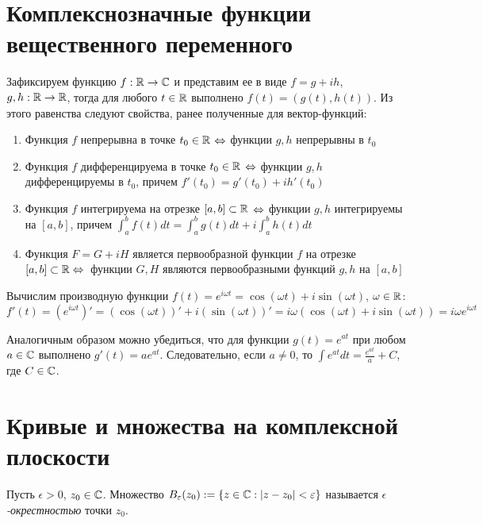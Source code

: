 \section{Комплекснозначные функции вещественного переменного}

\begin{note}
	Зафиксируем функцию $f : \mathbb{R} \to \mathbb{C}$ и представим ее в виде $f = g + ih$, $g, h : \mathbb{R} \to \mathbb{R}$, тогда для любого $t \in \mathbb{R}$ выполнено $f(t) = (g(t), h(t))$. Из этого равенства следуют свойства, ранее полученные для вектор-функций:
	\begin{enumerate}
		\item Функция $f$ непрерывна в точке $t_0 \in \mathbb{R}$ $\Leftrightarrow$ функции $g, h$ непрерывны в $t_0$
		\item Функция $f$ дифференцируема в точке $t_0 \in \mathbb{R}$ $\Leftrightarrow$ функции $g, h$ дифференцируемы в $t_0$, причем $f'(t_0) = g'(t_0) + ih'(t_0)$
		\item Функция $f$ интегрируема на отрезке $[a, b] \subset \mathbb{R}$ $\Leftrightarrow$ функции $g, h$ интегрируемы на $[a, b]$, причем $\int_a^bf(t)dt = \int_a^bg(t)dt + i\int_a^bh(t)dt$
		\item Функция $F = G + iH$ является первообразной функции $f$ на отрезке $[a, b] \subset \R \hm\lra$~функции $G, H$ являются первообразными функций $g, h$ на $[a, b]$
	\end{enumerate}
\end{note}

\begin{example}
	Вычислим производную функции $f(t) = e^{i\omega t} = \cos(\omega t) + i\sin(\omega t)$, $\omega \in \mathbb{R}$:
	\[f'(t) = \left(e^{i\omega t}\right)' = \left(\cos(\omega t)\right)' + i \left(\sin(\omega t)\right)' = i\omega(\cos(\omega t) + i\sin(\omega t)) = i\omega e^{i \omega t}\]
	
	Аналогичным образом можно убедиться, что для функции $g(t) = e^{at}$ при любом $a \in \mathbb{C}$ выполнено $g'(t) = ae^{at}$. Следовательно, если $a \ne 0$, то $\int e^{at}dt = \frac{e^{at}}{a} + C$, где $C \in \mathbb{C}$.
\end{example}

\section{Кривые и множества на комплексной плоскости}

\begin{definition}
	Пусть $\epsilon > 0$, $z_0 \in \mathbb{C}$. Множество $B_{\varepsilon}(z_0) := \{z \in \mathbb{C}: |z - z_0| < \varepsilon\}$ называется \textit{$\epsilon$-окрестностью} точки $z_0$.
\end{definition}


